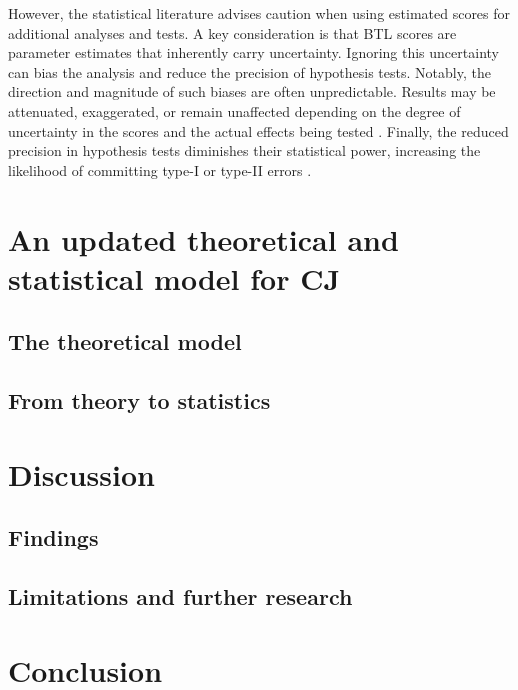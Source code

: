 \documentclass[
  authoryear,
  preprint,
  1p]{elsarticle}
\begin{document}
However, the statistical literature advises caution when using estimated
scores for additional analyses and tests. A key consideration is that
BTL scores are parameter estimates that inherently carry uncertainty.
Ignoring this uncertainty can bias the analysis and reduce the precision
of hypothesis tests. Notably, the direction and magnitude of such biases
are often unpredictable. Results may be attenuated, exaggerated, or
remain unaffected depending on the degree of uncertainty in the scores
and the actual effects being tested
\citetext{\citealp[pp.~25]{Kline_et_al_2023}; \citealp[pp.~137]{Hoyle_et_al_2023}}.
Finally, the reduced precision in hypothesis tests diminishes their
statistical power, increasing the likelihood of committing type-I or
type-II errors \citep{McElreath_2020}.

\section{An updated theoretical and statistical model for
CJ}\label{sec-theory}

\subsection{The theoretical model}\label{sec-theory-theoretical}

\subsection{From theory to statistics}\label{sec-theory-statistics}

\section{Discussion}\label{sec-discuss}

\subsection{Findings}\label{sec-discuss-finding}

\subsection{Limitations and further
research}\label{sec-discuss-limitations}

\section{Conclusion}\label{sec-conclusion}
\end{document}
